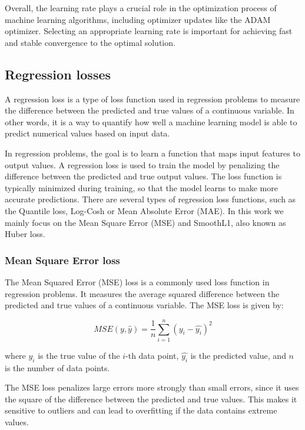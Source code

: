 Overall, the learning rate plays a crucial role in the optimization process of machine learning algorithms, including optimizer updates like the ADAM optimizer. Selecting an appropriate learning rate is important for achieving fast and stable convergence to the optimal solution.

\subsection{Regression losses}
\label{subsec:3_regression_losses}


A regression loss is a type of loss function used in regression problems to measure the difference between the predicted and true values of a continuous variable. In other words, it is a way to quantify how well a machine learning model is able to predict numerical values based on input data.

In regression problems, the goal is to learn a function that maps input features to output values. A regression loss is used to train the model by penalizing the difference between the predicted and true output values. The loss function is typically minimized during training, so that the model learns to make more accurate predictions. There are several types of regression loss functions, such as the Quantile loss, Log-Cosh or Mean Absolute Error (MAE). In this work we mainly focus on the Mean Square Error (MSE) and SmoothL1, also known as Huber loss.

\subsubsection{Mean Square Error loss}
\label{subsubsec:3_mse_loss}

The Mean Squared Error (MSE) loss is a commonly used loss function in regression problems. It measures the average squared difference between the predicted and true values of a continuous variable. The MSE loss is given by:

\begin{equation}
	MSE(y, \hat{y}) = \frac{1}{n}\sum_{i=1}^{n}(y_i - \hat{y_i})^2
\end{equation}

where $y_i$ is the true value of the $i$-th data point, $\hat{y_i}$ is the predicted value, and $n$ is the number of data points.

The MSE loss penalizes large errors more strongly than small errors, since it uses the square of the difference between the predicted and true values. This makes it sensitive to outliers and can lead to overfitting if the data contains extreme values.


